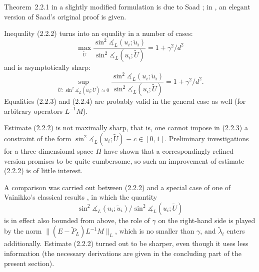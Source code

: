 \documentclass[11pt,oneside]{book}
\newcommand{\ang}{\measuredangle}
\begin{document}
Theorem~2.2.1 in a slightly modified formulation is due to Saad \citep{Saad1983}; in \citep{Parlett1983}, an elegant version of Saad's original proof \citep{Saad1980} is given.

Inequality (2.2.2) turns into an equality in a number of cases:
\[
\max_{\widetilde{U}} \frac{\sin^2 \ang_L(u_i; \tilde{u}_i)}{\sin^2 \ang_L(u_i; \widetilde{U})} = 1 + \gamma^2 / d^2 \tag{2.2.3}
\]
and is asymptotically sharp:
\[
\sup_{\widetilde{U} : \, \sin^2 \ang_L(u_i; \widetilde{U}) \approx 0} \frac{\sin^2 \ang_L(u_i; \tilde{u}_i)}{\sin^2 \ang_L(u_i; \widetilde{U})} = 1 + \gamma^2 / d^2 . \tag{2.2.4}
\]
Equalities (2.2.3) and (2.2.4) are probably valid in the general case as well (for arbitrary operators $L^{-1}M$).

Estimate (2.2.2) is not maximally sharp, that is, one cannot impose in (2.2.3) a constraint of the form $\sin^2 \ang_L(u_i; \widetilde{U}) \equiv c \in [0, 1]$. Preliminary investigations for a three-dimensional space $H$ have shown that a correspondingly refined version promises to be quite cumbersome, so such an improvement of estimate (2.2.2) is of little interest.

A comparison was carried out between (2.2.2) and a special case of one of Vainikko's classical results \citep{Krasnoselskii1969}, in which the quantity
\[
\sin^2 \ang_L(u_i; \tilde{u}_i) / \sin^2 \ang_L(u_i; \widetilde{U})
\]
is in effect also bounded from above, the role of $\gamma$ on the right-hand side is played by the norm $\| (E - \widetilde{P}_L) L^{-1} M \|_L$, which is no smaller than $\gamma$, and $\tilde{\lambda}_i$ enters additionally. Estimate (2.2.2) turned out to be sharper, even though it uses less information (the necessary derivations are given in the concluding part of the present section).
\end{document}
